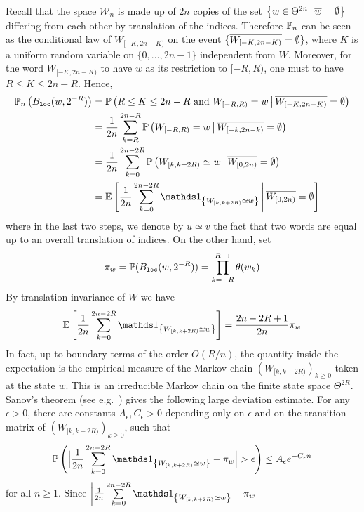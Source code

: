 \documentclass[a4paper]{article}
\newcommand*{\W}{\mathcal{W}}
\begin{document}
Recall that the space $\W_n$ is made up of $2n$ copies of the set $\left\{w\in\Theta^{2n}\,\middle|\,\overline{w}=\emptyset\right\}$ differing from each other by translation of the indices.
Therefore $\mathbb{P}_n$ can be seen as the conditional law of $W_{[-K,2n-K)}$ on the event  $\{\overline{W_{[-K,2n-K)}}=\emptyset \}$, where $K$ is a uniform random variable on $\{0,\ldots,2n-1\}$ independent from $W$.
Moreover, for the word $W_{[-K,2n-K)}$ to have $w$ as its restriction to $[-R,R)$, one must to have $R\leq K\leq 2n-R$.
Hence,
\begin{align*}
		\proba_n\Par{ B\sub{loc}(w,2^{-R}) } &=	\proba\Pcond{	R\leq K\leq 2n-R\text{ and }W_{[-R,R)} = w
					}{	\rd{W_{[-K,2n-K)}} = \emptystr 	}
\\&=	\frac{1}{2n} \sum_{k=R}^{2n-R}
		\proba\Pcond{	W_{[-R,R)} = w
					}{	\rd{W_{[-k,2n-k)}} = \emptystr 	}
\\&=	\frac{1}{2n} \sum_{k=0}^{2n-2R}
		\proba\Pcond{	W_{[k,k+2R)}\simeq w }{ \rd{W_{[0,2n)}}=\emptystr }
\\&=	\expect\Econd{	\frac{1}{2n} \sum_{k=0}^{2n-2R} \idd{ W_{[k,k+2R)}\simeq w }
					}{	\rd{W_{[0,2n)}}=\emptystr }
\end{align*}
where in the last two steps, we denote by $u\simeq v$ the fact that two words are equal
up to an overall translation of indices.
On the other hand, set
\begin{equation}
	\pi_w = \mathbb{P}(B_{\mathtt{loc}}(w,2^{-R})) = \prod_{k=-R}^{R-1} \theta(w_k)
\end{equation}
By translation invariance of $W$ we have
\begin{equation}
\expect\Sqpar{ \frac{1}{2n} \sum_{k=0}^{2n-2R} \idd{W_{[k,k+2R)}\simeq w} }
= \frac{2n-2R+1}{2n} \pi_w
\end{equation}
In fact, up to boundary terms of the order $O(R/n)$, the quantity inside the expectation
is the empirical measure of the Markov chain $(W_{[k,k+2R)})_{k\geq 0}$ taken at the state $w$.
This is an irreducible Markov chain on the finite state space $\Theta^{2R}$.
Sanov's theorem (see e.g.~\cite[Theorem 3.1.2]{Dem98}) gives the following large deviation estimate.
For any $\epsilon>0$, there are constants $A_\epsilon, C_\epsilon>0$ depending only on $\epsilon$
and on the transition matrix of $(W_{[k,k+2R)})_{k\geq 0}$, such that
\begin{equation}
	\proba\Par{ \Big|\frac{1}{2n} \sum_{k=0}^{2n-2R} \idd{W_{[k,k+2R)} \simeq w} - \pi_w \Big|
				>\epsilon }
\leq A_\epsilon e^{-C_\epsilon n}
\end{equation}
for all $n\geq 1$.
Since $\abs{\frac{1}{2n} \sum\limits_{k=0}^{2n-2R} \idd{W_{[k,k+2R)} \simeq w} - \pi_w}$
\end{document}
